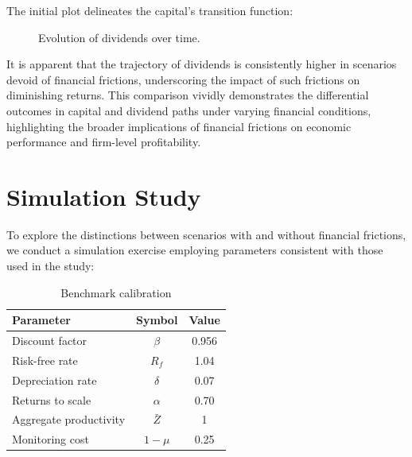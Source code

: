 \documentclass[12pt]{report}
\begin{document}
The initial plot delineates the capital's transition function:

\begin{figure}[H]
    \centering
    \caption{Evolution of dividends over time.}
    \label{fig:dividendsEvolution}
\end{figure}

It is apparent that the trajectory of dividends is consistently higher in scenarios devoid of financial frictions,
underscoring the impact of such frictions on diminishing returns. This comparison vividly demonstrates the differential
outcomes in capital and dividend paths under varying financial conditions, highlighting the broader implications of
financial frictions on economic performance and firm-level profitability. 

\section{Simulation Study}

To explore the distinctions between scenarios with and without financial frictions, we conduct a simulation exercise
employing  parameters consistent with those used in the \cite{OsePap17} study:

\begin{table}[H]
    \centering
    \begin{tabular}{lcc}
    \hline Parameter & Symbol & Value \\
    \hline \hline
    Discount factor & $\beta$ & 0.956 \\
    Risk-free rate & $R_f$ & 1.04 \\
    Depreciation rate & $\delta$ & 0.07 \\
    Returns to scale & $\alpha$ & 0.70 \\
    Aggregate productivity & $\bar{Z}$ & 1 \\
    Monitoring cost & $1-\mu$ & 0.25 \\
    \hline
    \end{tabular}
    \caption{Benchmark calibration}
\end{table}
\end{document}
